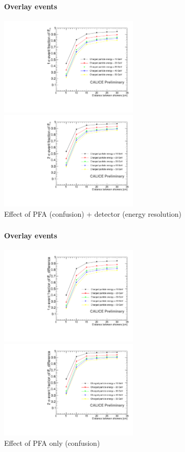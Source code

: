 \documentclass[8pt]{beamer}
\begin{document}
  \begin{frame}
  \frametitle{\secname}
  \framesubtitle{Overlay events}
    \begin{center}
      \includegraphics[width=0.5\textwidth]{plots/OverlayEvent_NeutralProba1Sigma.pdf}
      \includegraphics[width=0.5\textwidth]{plots/OverlayEvent_NeutralProba2Sigma.pdf} \\
      Effect of PFA (confusion) + detector (energy resolution)
    \end{center}
  \end{frame}
  
  \begin{frame}
  \frametitle{\secname}
  \framesubtitle{Overlay events}
    \begin{center}
      \includegraphics[width=0.5\textwidth]{plots/OverlayEvent_NeutralDifferenceProba1Sigma.pdf}
      \includegraphics[width=0.5\textwidth]{plots/OverlayEvent_NeutralDifferenceProba2Sigma.pdf} \\
      Effect of PFA only (confusion)
    \end{center}
  \end{frame}
  
\end{document}
